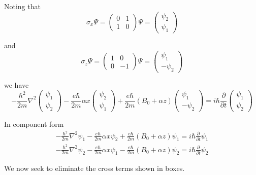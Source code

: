 Noting that
\begin{equation*}
\sigma_x\Psi
=\begin{pmatrix}0&1\\1&0\end{pmatrix}\Psi
=\begin{pmatrix}\psi_2\\\psi_1\end{pmatrix}
\end{equation*}

and
\begin{equation*}
\sigma_z\Psi
=\begin{pmatrix}1&0\\0&-1\end{pmatrix}\Psi
=\begin{pmatrix}\psi_1\\-\psi_2\end{pmatrix}
\end{equation*}

we have
\begin{equation*}
-\frac{\hbar^2}{2m}\nabla^2\begin{pmatrix}\psi_1\\\psi_2\end{pmatrix}
-\frac{e\hbar}{2m}\alpha x\begin{pmatrix}\psi_2\\\psi_1\end{pmatrix}
+\frac{e\hbar}{2m}(B_0+\alpha z)\begin{pmatrix}\psi_1\\-\psi_2\end{pmatrix}
=i\hbar\frac{\partial}{\partial t}\begin{pmatrix}\psi_1\\\psi_2\end{pmatrix}
\end{equation*}

In component form
\begin{equation*}
\begin{aligned}
-\frac{\hbar^2}{2m}\nabla^2\psi_1
-\boxed{\frac{e\hbar}{2m}\alpha x\psi_2}
+\frac{e\hbar}{2m}(B_0+\alpha z)\psi_1
=i\hbar\frac{\partial}{\partial t}\psi_1
\\[1ex]
-\frac{\hbar^2}{2m}\nabla^2\psi_2
-\boxed{\frac{e\hbar}{2m}\alpha x\psi_1}
-\frac{e\hbar}{2m}(B_0+\alpha z)\psi_2
=i\hbar\frac{\partial}{\partial t}\psi_2
\end{aligned}
\tag{1}
\end{equation*}

We now seek to eliminate the cross terms shown in boxes.

